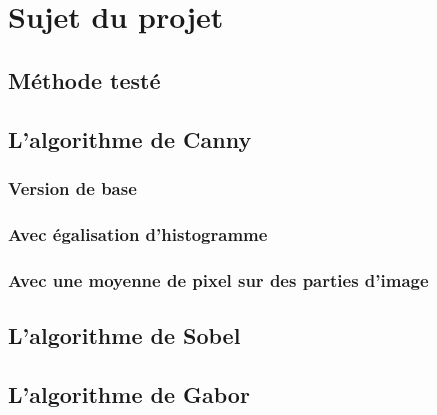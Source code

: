 \section{Sujet du projet}

\subsection{Méthode testé}

\subsection{L'algorithme de Canny}
\subsubsection{Version de base}
\subsubsection{Avec égalisation d'histogramme}
\subsubsection{Avec une moyenne de pixel sur des parties d'image}

\subsection{L'algorithme de Sobel}

\subsection{L'algorithme de Gabor}